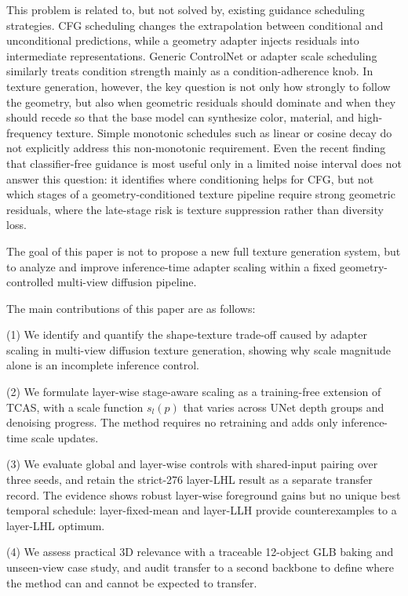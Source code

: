 \documentclass[times,twocolumn,final]{elsarticle}
\begin{document}
This problem is related to, but not solved by, existing guidance scheduling strategies. CFG scheduling changes the extrapolation between conditional and unconditional predictions, while a geometry adapter injects residuals into intermediate representations. Generic ControlNet or adapter scale scheduling similarly treats condition strength mainly as a condition-adherence knob. In texture generation, however, the key question is not only how strongly to follow the geometry, but also when geometric residuals should dominate and when they should recede so that the base model can synthesize color, material, and high-frequency texture. Simple monotonic schedules such as linear or cosine decay do not explicitly address this non-monotonic requirement. Even the recent finding that classifier-free guidance is most useful only in a limited noise interval \cite{kynkanniemi2024limited} does not answer this question: it identifies where conditioning helps for CFG, but not which stages of a geometry-conditioned texture pipeline require strong geometric residuals, where the late-stage risk is texture suppression rather than diversity loss.

The goal of this paper is not to propose a new full texture generation system, but to analyze and improve inference-time adapter scaling within a fixed geometry-controlled multi-view diffusion pipeline.

The main contributions of this paper are as follows:

(1) We identify and quantify the shape-texture trade-off caused by adapter scaling in multi-view diffusion texture generation, showing why scale magnitude alone is an incomplete inference control.

(2) We formulate layer-wise stage-aware scaling as a training-free extension of TCAS, with a scale function $s_l(p)$ that varies across UNet depth groups and denoising progress. The method requires no retraining and adds only inference-time scale updates.

(3) We evaluate global and layer-wise controls with shared-input pairing over three seeds, and retain the strict-276 layer-LHL result as a separate transfer record. The evidence shows robust layer-wise foreground gains but no unique best temporal schedule: layer-fixed-mean and layer-LLH provide counterexamples to a layer-LHL optimum.

(4) We assess practical 3D relevance with a traceable 12-object GLB baking and unseen-view case study, and audit transfer to a second backbone to define where the method can and cannot be expected to transfer.
\end{document}
